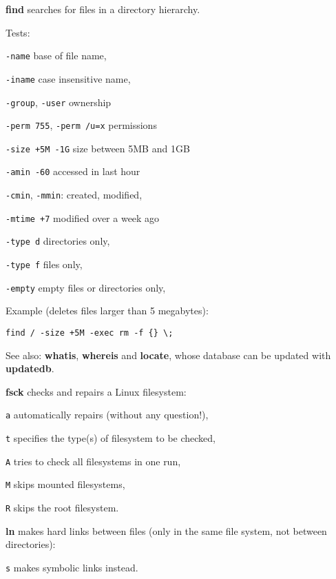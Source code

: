 \begin{compactenum}
	\item [\cmdvar] \textbf{find} searches for files in a directory hierarchy.
	\item Tests:
	\item [] \texttt{-name} \hfill base of file name,
	\item [] \texttt{-iname} \hfill case insensitive name,
	\item [] \texttt{-group}, \texttt{-user} \hfill ownership
	\item [] \texttt{-perm 755}, \texttt{-perm /u=x} \hfill permissions
	\item [] \texttt{-size +5M -1G} \hfill size between 5MB and 1GB
	\item [] \texttt{-amin -60} \hfill accessed in last hour
	\item [] \texttt{-cmin}, \texttt{-mmin}: \hfill created, modified,
	\item [] \texttt{-mtime +7} \hfill modified over a week ago
	\item [] \texttt{-type d} \hfill directories only,
	\item [] \texttt{-type f} \hfill files only,
	\item [] \texttt{-empty} \hfill empty files or directories only,
	\item Example (deletes files larger than 5 megabytes): 
	\item [] \texttt{find / -size +5M -exec rm -f \{\} \textbackslash{};}
	\item [\cmdvar] See also: \textbf{whatis}, \textbf{whereis} and \textbf{locate}, whose database can be updated with \textbf{updatedb}.
\end{compactenum}

\begin{compactenum}
	\item [\cmdutil] \textbf{fsck} checks and repairs a Linux filesystem:
	\item [\texttt{a}] automatically repairs (without any question!),
	\item [\texttt{t}] specifies the type(s) of filesystem to be checked,
	\item [\texttt{A}] tries to check all filesystems in one run,
	\item [\texttt{M}] skips mounted filesystems,
	\item [\texttt{R}] skips the root filesystem.
\end{compactenum}

\begin{compactenum}
	\item [\cmdcore] \textbf{ln} makes hard links between files
	(only in the same file system, not between directories):
	\item [\texttt{s}]  makes symbolic links instead.
\end{compactenum}

